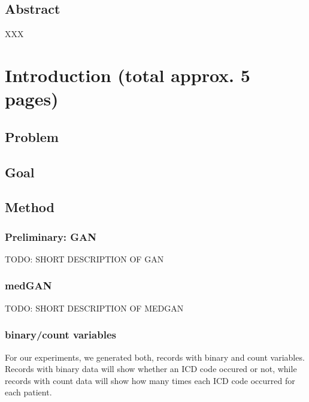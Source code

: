 \documentclass[11pt, a4paper]{book}
\def\blankpage{%
      \clearpage%
      \thispagestyle{empty}%
      \addtocounter{page}{-1}%
      \null%
      \clearpage}
\begin{document}
\pagestyle{fancy}
\thispagestyle{empty}
\renewcommand{\bibname}{References}

\renewcommand\theadfont{\normalsize}

\thispagestyle{empty}
\maketitle

\blankpage

\thispagestyle{empty}
\section*{Abstract}
XXX


\blankpage

\clearpage

\thispagestyle{empty}
\tableofcontents

\blankpage







\chapter{Introduction (total approx. 5 pages)}

\section{Problem}
\section{Goal}

\section{Method}
\subsection{Preliminary: GAN}
TODO: SHORT DESCRIPTION OF GAN
\subsection{medGAN}
TODO: SHORT DESCRIPTION OF MEDGAN
\subsection{binary/count variables}
For our experiments, we generated both, records with binary and count variables. Records with binary data will show whether an ICD code occured or not, while records with count data will show how many times each ICD code occurred for each patient.
\end{document}

